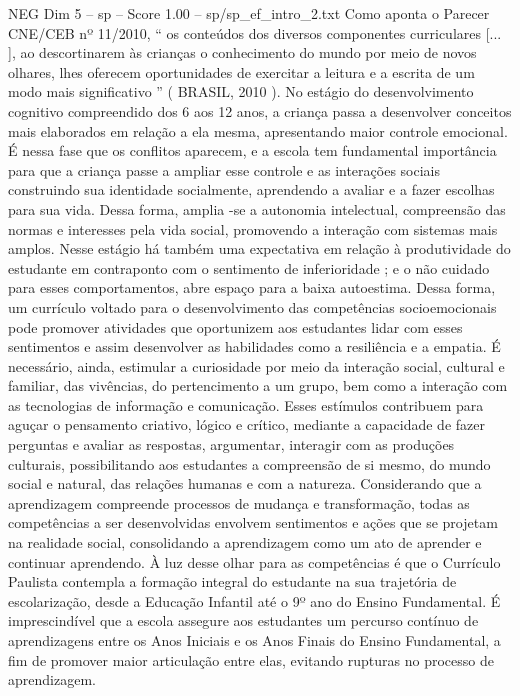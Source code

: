 \begin{textsample}{NEG Dim 5 – sp – Score 1.00 – sp/sp\_ef\_intro\_2.txt}
Como aponta o Parecer CNE/CEB nº 11/2010, “ os conteúdos dos diversos componentes curriculares [... ], ao descortinarem às crianças o conhecimento do mundo por meio de novos olhares, lhes oferecem oportunidades de exercitar a leitura e a escrita de um modo mais significativo ” ( BRASIL, 2010 ).
No estágio do desenvolvimento cognitivo compreendido dos 6 aos 12 anos, a criança passa a desenvolver conceitos mais elaborados em relação a ela mesma, apresentando maior controle emocional.
É nessa fase que os conflitos aparecem, e a escola tem fundamental importância para que a criança passe a ampliar esse controle e as interações sociais construindo sua identidade socialmente, aprendendo a avaliar e a fazer escolhas para sua vida.
Dessa forma, amplia -se a autonomia intelectual, compreensão das normas e interesses pela vida social, promovendo a interação com sistemas mais amplos.
Nesse estágio há também uma expectativa em relação à produtividade do estudante em contraponto com o sentimento de inferioridade ; e o não cuidado para esses comportamentos, abre espaço para a baixa autoestima.
Dessa forma, um currículo voltado para o desenvolvimento das competências socioemocionais pode promover atividades que oportunizem aos estudantes lidar com esses sentimentos e assim desenvolver as habilidades como a resiliência e a empatia.
É necessário, ainda, estimular a curiosidade por meio da interação social, cultural e familiar, das vivências, do pertencimento a um grupo, bem como a interação com as tecnologias de informação e comunicação.
Esses estímulos contribuem para aguçar o pensamento criativo, lógico e crítico, mediante a capacidade de fazer perguntas e avaliar as respostas, argumentar, interagir com as produções culturais, possibilitando aos estudantes a compreensão de si mesmo, do mundo social e natural, das relações humanas e com a natureza.
Considerando que a aprendizagem compreende processos de mudança e transformação, todas as competências a ser desenvolvidas envolvem sentimentos e ações que se projetam na realidade social, consolidando a aprendizagem como um ato de aprender e continuar aprendendo.
À luz desse olhar para as competências é que o Currículo Paulista contempla a formação integral do estudante na sua trajetória de escolarização, desde a Educação Infantil até o 9º ano do Ensino Fundamental.
É imprescindível que a escola assegure aos estudantes um percurso contínuo de aprendizagens entre os Anos Iniciais e os Anos Finais do Ensino Fundamental, a fim de promover maior articulação entre elas, evitando rupturas no processo de aprendizagem.

\end{textsample}
